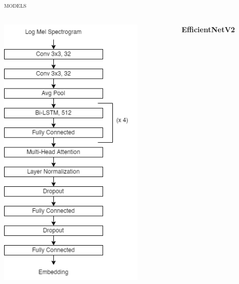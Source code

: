\documentclass[10pt,aspectratio=1610,professionalfont]{beamer}
\begin{document}
\begin{frame}{\textsc{models}}
\begin{columns}
\begin{column}{0.33\textwidth}
\begin{center}
		     		\includegraphics[width=0.8\textwidth]{img/las_mha.png}
		    	\end{center}
		\end{column}
		\begin{column}{0.33\textwidth}
			\begin{center}
				\textbf{\large{EfficientNetV2}}

\end{center}
\end{column}
\end{columns}
\end{frame}
\end{document}

